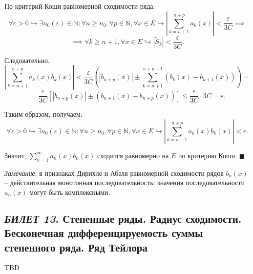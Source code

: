\documentclass[12pt, a4paper, reqno]{article}
\begin{document}
    По критерий Коши равномерной сходимости ряда:
    \begin{equation*}
        \forall \varepsilon > 0 \hookrightarrow \exists n_0(\varepsilon) \in \mathbb{N}:
        \forall n \geq n_0, \forall p \in \mathbb{N}, \forall x \in E \hookrightarrow
        \left|\sum\limits_{k = n + 1}^{n + p} a_k(x)\right| < \frac{\varepsilon}{3C} \implies
    \end{equation*}
    \begin{equation*}
        \implies \forall k \geq n + 1, \forall x \in E \hookrightarrow |\tilde{S}_k| < \frac{\varepsilon}{3C}.
    \end{equation*}

    Следовательно,
    \begin{equation*}
        \left|\sum\limits_{k = n + 1}^{n + p} a_k(x) b_k(x)\right| <
        \frac{\varepsilon}{3C}\left(
            |b_{n + p}(x)| \pm \sum\limits_{k = n + 1}^{n + p - 1} (b_k(x) - b_{k + 1}(x))
        \right) =
    \end{equation*}
    \begin{equation*}
        = \frac{\varepsilon}{3C} [|b_{n + p}(x)| \pm (b_{n + 1}(x) - b_{n + p}(x))] \leq
        \frac{\varepsilon}{3C} \cdot 3C = \varepsilon.
    \end{equation*}

    Таким образом, получаем:
    \begin{equation*}
        \forall \varepsilon > 0 \hookrightarrow \exists n_0(\varepsilon) \in \mathbb{N}:
        \forall n \geq n_0, \forall p \in \mathbb{N}, \forall x \in E \hookrightarrow
        \left|\sum\limits_{k = n + 1}^{n + p} a_k(x)b_k(x)\right| < \varepsilon.
    \end{equation*}

    Значит, $\sum\limits_{n = 1}^{\infty} a_n(x)b_n(x)$ сходится равномерно на $E$ по критерию Коши.
    $\blacksquare$

    \textit{Замечание}: в признаках Дирихле и Абеля равномерной сходимости рядов $b_n(x)$ --
    действительная монотонная последовательность; значения последовательности $a_n(x)$ могут быть
    комплексными.

\newpage
\subsection{\textit{БИЛЕТ 13}. Степенные ряды. Радиус сходимости. Бесконечная дифференцируемость
            суммы степенного ряда. Ряд Тейлора}

    TBD
\end{document}
